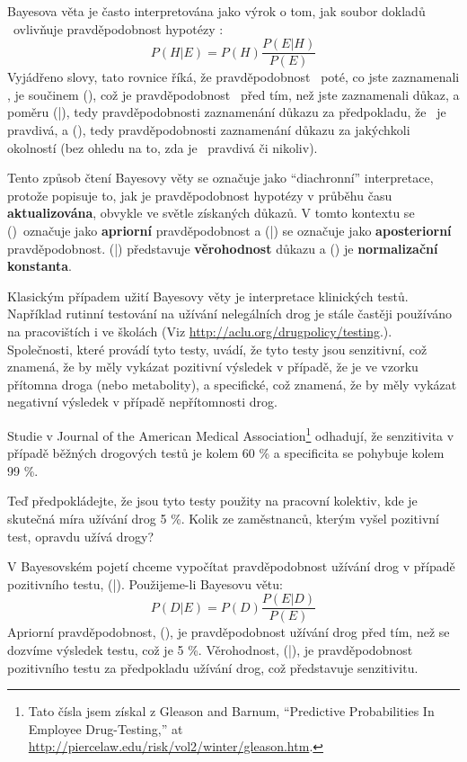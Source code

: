 \documentclass[12pt]{book}
\begin{document}
Bayesova věta je často interpretována jako výrok o tom, jak soubor dokladů \E~ovlivňuje pravděpodobnost hypotézy \HH:
%
\[ P(H|E) = P(H) \frac{P(E|H)}{P(E)} \]
%
Vyjádřeno slovy, tato rovnice říká, že pravděpodobnost \HH~poté, co jste zaznamenali
\E, je součinem \Prob(\HH), což je pravděpodobnost \HH~před tím, než jste zaznamenali důkaz, a poměru \Prob(\E|\HH), tedy pravděpodobnosti zaznamenání důkazu za předpokladu, že \HH~je pravdivá, a \Prob(\E), tedy pravděpodobnosti zaznamenání důkazu za jakýchkoli okolností (bez ohledu na to, zda je \HH~pravdivá či nikoliv).

Tento způsob čtení Bayesovy věty se označuje jako ``diachronní''
interpretace, protože popisuje to, jak je pravděpodobnost hypotézy v průběhu času {\bf aktualizována}, obvykle ve světle získaných důkazů. V tomto kontextu se \Prob(\HH)\ označuje jako {\bf apriorní}
pravděpodobnost a \Prob(\HH|\E) se označuje jako {\bf aposteriorní} pravděpodobnost.
\Prob(\E|\HH) představuje {\bf věrohodnost} důkazu a \Prob(\E) je {\bf normalizační konstanta}.

Klasickým případem užití Bayesovy věty je interpretace klinických testů. Například rutinní testování na užívání nelegálních drog je stále častěji používáno na pracovištích i ve školách (Viz
\url{http://aclu.org/drugpolicy/testing}.).  Společnosti, které provádí tyto testy, uvádí, že tyto testy jsou senzitivní, což znamená, že by měly vykázat pozitivní výsledek v případě, že je ve vzorku přítomna droga (nebo metabolity), a specifické, což znamená, že by měly vykázat negativní výsledek v případě nepřítomnosti drog.

Studie v Journal of the American Medical
Association\footnote{Tato čísla jsem získal z Gleason and Barnum,
  ``Predictive Probabilities In Employee Drug-Testing,'' at
  \url{http://piercelaw.edu/risk/vol2/winter/gleason.htm}.} odhadují, že senzitivita v případě běžných drogových testů je kolem 60 \% a specificita se pohybuje kolem 99 \%.

Teď předpokládejte, že jsou tyto testy použity na pracovní kolektiv, kde je skutečná míra užívání drog 5 \%.  Kolik ze zaměstnanců, kterým vyšel pozitivní test, opravdu užívá drogy?

V Bayesovském pojetí chceme vypočítat pravděpodobnost užívání drog v případě pozitivního testu, \Prob(\D|\E).  Použijeme-li Bayesovu větu:
%
\[ P(D|E) = P(D) \frac{P(E|D)}{P(E)} \]
%
Apriorní pravděpodobnost, \Prob(\D), je pravděpodobnost užívání drog před tím, než se dozvíme výsledek testu, což je 5 \%.
Věrohodnost, \Prob(\E|\D), je pravděpodobnost pozitivního testu za předpokladu užívání drog, což představuje senzitivitu.
\end{document}
